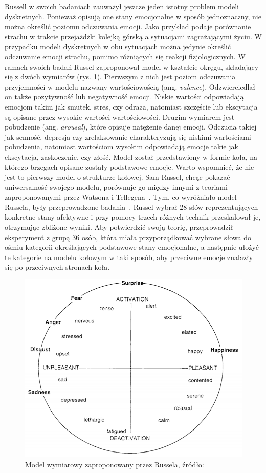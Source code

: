 Russell w swoich badaniach zauważył jeszcze jeden istotny problem modeli dyskretnych. Ponieważ opisują one stany emocjonalne w sposób jednoznaczny, nie można określić poziomu odczuwania emocji. Jako przykład podaje porównanie strachu w trakcie przejażdżki kolejką górską a sytuacjami zagrażającymi życiu. W przypadku modeli dyskretnych w obu sytuacjach można jedynie określić odczuwanie emocji strachu, pomimo różniących się reakcji fizjologicznych. W ramach swoich badań Russel zaproponował model w kształcie okręgu, składający się z dwóch wymiarów (rys. \ref{fig:circumplex}). Pierwszym z nich jest poziom odczuwania przyjemności w modelu nazwany wartościowością (ang. \textit{valence}). Odzwierciedlał on także pozytywność lub negatywność emocji. Niskie wartości odpowiadają emocjom takim jak smutek, stres, czy odraza, natomiast szczęście lub ekscytacja są opisane przez wysokie wartości wartościowości. Drugim wymiarem jest pobudzenie (ang. \textit{arousal}), które opisuje natężenie danej emocji. Odczucia takiej jak senność, depresja czy zrelaksowanie charakteryzują się niskimi wartościami pobudzenia, natomiast wartościom wysokim odpowiadają emocje takie jak ekscytacja, zaskoczenie, czy złość. Model został przedstawiony w formie koła, na którego brzegach opisane zostały podstawowe emocje. Warto wspomnieć, że nie jest to pierwszy model o strukturze kołowej. Sam Russel, chcąc pokazać uniwersalność swojego modelu, porównuje go między innymi z teoriami zaproponowanymi przez Watsona i Tellegena~\cite{Watson_1985}. Tym, co wyróżniało model Russela, były przeprowadzone badania~\cite{circumplex_model_russel_1980}. Russel wybrał 28 słów reprezentujących konkretne stany afektywne i przy pomocy trzech różnych technik przeskalował je, otrzymując zbliżone wyniki. Aby potwierdzić swoją teorię, przeprowadził eksperyment z grupą 36 osób, która miała przyporządkować wybrane słowa do ośmiu kategorii określających podstawowe stany emocjonalne, a następnie ułożyć te kategorie na modelu kołowym w taki sposób, aby przeciwne emocje znalazły się po przeciwnych stronach koła.

\begin{figure}[h]
	\centering
	\includegraphics[width=0.6\linewidth]{images/circumplex.png}
	\caption{Model wymiarowy zaproponowany przez Russela, źródło: \cite{russel_barret_core_affect}}
	\label{fig:circumplex}
\end{figure}

